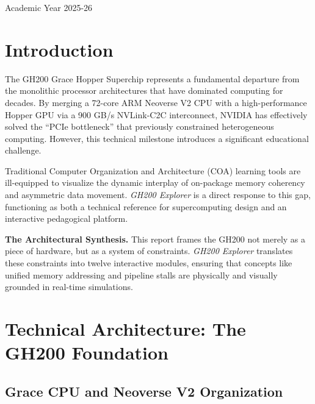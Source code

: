 \documentclass[12pt, a4paper]{article}
\begin{document}
\begin{titlepage}
  \vfill
  {\large Academic Year 2025-26}
\end{titlepage}

\restoregeometry
{}

\newpage

\thispagestyle{fancy}
\tableofcontents
\newpage

\section{Introduction}
\label{sec:intro}

The GH200 Grace Hopper Superchip represents a fundamental departure from the monolithic processor architectures that have dominated computing for decades. By merging a 72-core ARM Neoverse V2 CPU with a high-performance Hopper GPU via a 900 GB/s NVLink-C2C interconnect, NVIDIA has effectively solved the ``PCIe bottleneck'' that previously constrained heterogeneous computing. However, this technical milestone introduces a significant educational challenge. 

Traditional Computer Organization and Architecture (COA) learning tools are ill-equipped to visualize the dynamic interplay of on-package memory coherency and asymmetric data movement. \textit{GH200 Explorer} is a direct response to this gap, functioning as both a technical reference for supercomputing design and an interactive pedagogical platform.

\begin{keybox}
\textbf{The Architectural Synthesis.}
This report frames the GH200 not merely as a piece of hardware, but as a system of constraints. \textit{GH200 Explorer} translates these constraints into twelve interactive modules, ensuring that concepts like unified memory addressing and pipeline stalls are physically and visually grounded in real-time simulations.
\end{keybox}

\section{Technical Architecture: The GH200 Foundation}
\label{sec:architecture}

\subsection{ Grace CPU and Neoverse V2 Organization}
\end{document}
